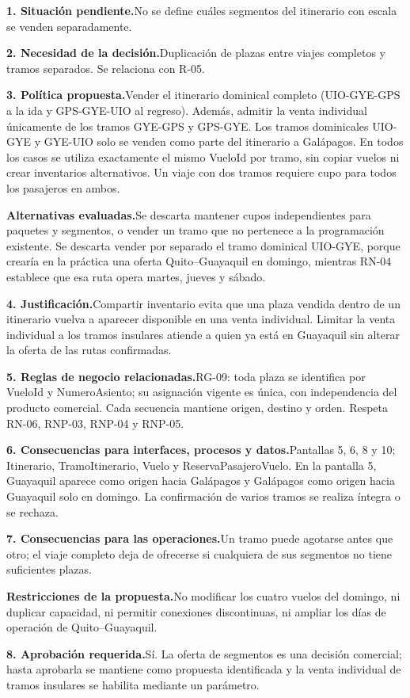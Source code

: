 \documentclass[11pt,a4paper]{article}
\newcommand{\fichacampo}[2]{\noindent\textbf{\color{azulvip}#1}\enspace #2\par\vspace{3pt}}
\begin{document}
{\normalsize
\fichacampo{1. Situación pendiente.}{No se define cuáles segmentos del itinerario con escala se venden separadamente.}
\fichacampo{2. Necesidad de la decisión.}{Duplicación de plazas entre viajes completos y tramos separados. Se relaciona con R-05.}
\fichacampo{3. Política propuesta.}{Vender el itinerario dominical completo (UIO-GYE-GPS a la ida y GPS-GYE-UIO al regreso). Además, admitir la venta individual únicamente de los tramos GYE-GPS y GPS-GYE. Los tramos dominicales UIO-GYE y GYE-UIO solo se venden como parte del itinerario a Galápagos. En todos los casos se utiliza exactamente el mismo VueloId por tramo, sin copiar vuelos ni crear inventarios alternativos. Un viaje con dos tramos requiere cupo para todos los pasajeros en ambos.}
\fichacampo{Alternativas evaluadas.}{Se descarta mantener cupos independientes para paquetes y segmentos, o vender un tramo que no pertenece a la programación existente. Se descarta vender por separado el tramo dominical UIO-GYE, porque crearía en la práctica una oferta Quito--Guayaquil en domingo, mientras RN-04 establece que esa ruta opera martes, jueves y sábado.}
\fichacampo{4. Justificación.}{Compartir inventario evita que una plaza vendida dentro de un itinerario vuelva a aparecer disponible en una venta individual. Limitar la venta individual a los tramos insulares atiende a quien ya está en Guayaquil sin alterar la oferta de las rutas confirmadas.}
\fichacampo{5. Reglas de negocio relacionadas.}{RG-09: toda plaza se identifica por VueloId y NumeroAsiento; su asignación vigente es única, con independencia del producto comercial. Cada secuencia mantiene origen, destino y orden. Respeta RN-06, RNP-03, RNP-04 y RNP-05.}
\fichacampo{6. Consecuencias para interfaces, procesos y datos.}{Pantallas 5, 6, 8 y 10; Itinerario, TramoItinerario, Vuelo y ReservaPasajeroVuelo. En la pantalla 5, Guayaquil aparece como origen hacia Galápagos y Galápagos como origen hacia Guayaquil solo en domingo. La confirmación de varios tramos se realiza íntegra o se rechaza.}
\fichacampo{7. Consecuencias para las operaciones.}{Un tramo puede agotarse antes que otro; el viaje completo deja de ofrecerse si cualquiera de sus segmentos no tiene suficientes plazas.}
\fichacampo{Restricciones de la propuesta.}{No modificar los cuatro vuelos del domingo, ni duplicar capacidad, ni permitir conexiones discontinuas, ni ampliar los días de operación de Quito--Guayaquil.}
\fichacampo{8. Aprobación requerida.}{Sí. La oferta de segmentos es una decisión comercial; hasta aprobarla se mantiene como propuesta identificada y la venta individual de tramos insulares se habilita mediante un parámetro.}
}
\clearpage
\end{document}
